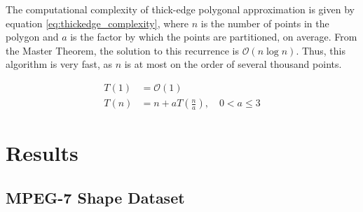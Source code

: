 \documentclass[10pt,twocolumn,letterpaper]{article}
\begin{document}
The computational complexity of thick-edge polygonal approximation is given by equation \ref{eq:thickedge_complexity},
where $n$ is the number of points in the polygon and $a$ is the factor by which the points are partitioned, on average.
From the Master Theorem, the solution to this recurrence is $\mathcal{O}(n \log{n})$. Thus, this algorithm is very fast,
as $n$ is at most on the order of several thousand points.

\begin{equation}
	\begin{split}
		T(1) &= \mathcal{O}(1) \\
		T(n) &= n + a T \left( \frac{n}{a} \right), \quad 0 < a \leq 3
    \end{split}
    \label{eq:thickedge_complexity}
\end{equation}


\section{Results}

\subsection{MPEG-7 Shape Dataset}
\end{document}
